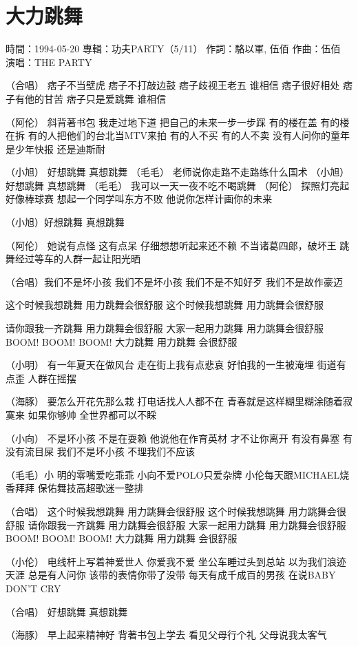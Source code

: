 \documentclass[UTF8,a4paper,oneside,twocolumn,12pt]{ctexbook}
\newcommand{\infopair}[2]{\textbullet #1：#2}
\newcommand{\zc}[1][伍佰]{\infopair{作詞}{#1}}
\newcommand{\zq}[1][伍佰]{\infopair{作曲}{#1}}
\newcommand{\zj}[1]{\infopair{專輯}{#1}}
\newcommand{\sj}[1]{\infopair{時間}{#1}}
\newenvironment{info}{\begin{flushleft}\kaishu
	}
	{\end{flushleft}\normalsize\yahei\par}
\newenvironment{lyric}{
	}
{}
\begin{document}
\section{大力跳舞}
\begin{info}
	\sj{1994-05-20}
	\zj{功夫PARTY（5/11）}
	\zc[駱以軍, 伍佰]
	\zq
	\infopair{演唱}{THE PARTY}
\end{info}
\begin{lyric}
	（合唱）
	痞子不当壁虎 痞子不打敲边鼓
	痞子歧视王老五 谁相信
	痞子很好相处 痞子有他的甘苦
	痞子只是爱跳舞 谁相信

	（阿伦）
	斜背著书包 我走过地下道 把自己的未来一步一步踩
	有的楼在盖 有的楼在拆 有的人把他们的台北当MTV来拍
	有的人不买 有的人不卖 没有人问你的童年是少年快报
	还是迪斯耐

	（小旭） 好想跳舞 真想跳舞
	（毛毛） 老师说你走路不走路练什么国术
	（小旭） 好想跳舞 真想跳舞
	（毛毛） 我可以一天一夜不吃不喝跳舞
	（阿伦） 探照灯亮起 好像棒球赛 想起一个同学叫东方不败
	他说你怎样计画你的未来

	（小旭）好想跳舞 真想跳舞

	（阿伦）
	她说有点怪 这有点呆
	仔细想想听起来还不赖
	不当诸葛四郎，破坏王
	跳舞经过等车的人群一起让阳光晒

	（合唱）我们不是坏小孩 我们不是坏小孩
	我们不是不知好歹 我们不是故作豪迈

	这个时候我想跳舞 用力跳舞会很舒服
	这个时候我想跳舞 用力跳舞会很舒服

	请你跟我一齐跳舞 用力跳舞会很舒服
	大家一起用力跳舞 用力跳舞会很舒服
	BOOM! BOOM! BOOM! 大力跳舞
	用力跳舞 会很舒服

	（小明）
	有一年夏天在做风台 走在街上我有点悲哀
	好怕我的一生被淹埋 街道有点歪 人群在摇摆

	（海豚）
	要怎么开花先那么栽 打电话找人人都不在
	青春就是这样糊里糊涂随着寂寞来 如果你够帅
	全世界都可以不睬

	（小向）
	不是坏小孩 不是在耍赖 他说他在作育英材
	才不让你离开
	有没有鼻塞 有没有流目屎 我们不是坏小孩
	不理我们不应该

	（毛毛）小
	明的零嘴爱吃乖乖 小向不爱POLO只爱杂牌
	小伦每天跟MICHAEL烧香拜拜
	保佑舞技高超歌迷一整排

	（合唱）
	这个时候我想跳舞 用力跳舞会很舒服
	这个时候我想跳舞 用力跳舞会很舒服
	请你跟我一齐跳舞 用力跳舞会很舒服
	大家一起用力跳舞 用力跳舞会很舒服
	BOOM! BOOM! BOOM! 大力跳舞 用力跳舞 会很舒服

	（小伦）
	电线杆上写着神爱世人 你爱我不爱
	坐公车睡过头到总站 以为我们浪迹天涯
	总是有人问你 该带的表情你带了没带
	每天有成千成百的男孩 在说BABY DON'T CRY

	（合唱） 好想跳舞 真想跳舞

	（海豚）
	早上起来精神好 背著书包上学去
	看见父母行个礼 父母说我太客气
\end{lyric}
\end{document}
